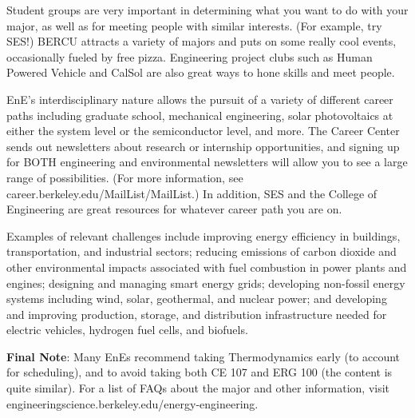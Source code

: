Student groups are very important in determining what you want to do with your major, as well as for meeting people with similar interests. (For example, try SES!) BERCU attracts a variety of majors and puts on some really cool events, occasionally fueled by free pizza. Engineering project clubs such as Human Powered Vehicle and CalSol are also great ways to hone skills and meet people.
 
EnE’s interdisciplinary nature allows the pursuit of a variety of different career paths including graduate school, mechanical engineering, solar photovoltaics at either the system level or the semiconductor level, and more. The Career Center sends out newsletters about research or internship opportunities, and signing up for BOTH engineering and environmental newsletters will allow you to see a large range of possibilities. (For more information, see {\selectfont career.berkeley.edu/MailList/MailList}.) In addition, SES and the College of Engineering are great resources for whatever career path you are on.
 
Examples of relevant challenges include improving energy efficiency in buildings, transportation, and industrial sectors; reducing emissions of carbon dioxide and other environmental impacts associated with fuel combustion in power plants and engines; designing and managing smart energy grids; developing non-fossil energy systems including wind, solar, geothermal, and nuclear power; and developing and improving production, storage, and distribution infrastructure needed for electric vehicles, hydrogen fuel cells, and biofuels.

\textbf{Final Note}: Many EnEs recommend taking Thermodynamics early (to account for scheduling), and to avoid taking both CE 107 and ERG 100 (the content is quite similar). For a list of FAQs about the major and other information, visit {\selectfont engineeringscience.berkeley.edu/energy-engineering}.

